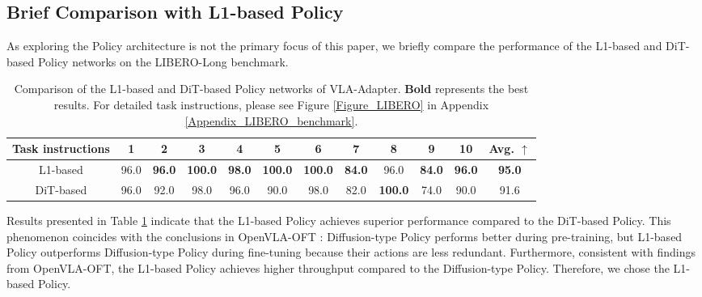 \subsection{Brief Comparison with L1-based Policy}\label{Appendix_DiT_3}
As exploring the Policy architecture is not the primary focus of this paper, we briefly compare the performance of the L1-based and DiT-based Policy networks on the LIBERO-Long benchmark.

\begin{table}[!htbp]
	\centering
	\small
	\caption{Comparison of the L1-based and DiT-based Policy networks of VLA-Adapter. \textbf{Bold} represents the best results. For detailed task instructions, please see Figure \ref{Figure_LIBERO} in Appendix \ref{Appendix_LIBERO_benchmark}.}\label{Table_DiT}%
	\begin{tabular}{c|cccccccccc|c}
		\toprule[1pt]
		\textbf{Task instructions} &1&2&3&4&5&6&7&8&9&10& \textbf{Avg. $\uparrow$}\\
		\midrule[0.5pt]
		\multicolumn{1}{c|}{L1-based} &\multicolumn{1}{c}{96.0}&\multicolumn{1}{c}{\textbf{96.0}}& \multicolumn{1}{c}{\textbf{100.0}} &\multicolumn{1}{c}{\textbf{98.0}}&\multicolumn{1}{c}{\textbf{100.0}}& \multicolumn{1}{c}{\textbf{100.0}}& \multicolumn{1}{c}{\textbf{84.0}}& \multicolumn{1}{c}{96.0}& \multicolumn{1}{c}{\textbf{84.0}}& \multicolumn{1}{c|}{\textbf{96.0}}&\multicolumn{1}{c}{\textbf{95.0}} \\
        
		\multicolumn{1}{c|}{DiT-based} & \multicolumn{1}{c}{96.0}&\multicolumn{1}{c}{92.0}&\multicolumn{1}{c}{98.0}&\multicolumn{1}{c}{96.0}&\multicolumn{1}{c}{90.0}& \multicolumn{1}{c}{98.0} &\multicolumn{1}{c}{82.0}& \multicolumn{1}{c}{\textbf{100.0}} &\multicolumn{1}{c}{74.0}& \multicolumn{1}{c|}{90.0}&\multicolumn{1}{c}{91.6} \\
		\bottomrule[1pt]
	\end{tabular}%
\end{table}%

Results presented in Table \ref{Table_DiT} indicate that the L1-based Policy achieves superior performance compared to the DiT-based Policy. This phenomenon coincides with the conclusions in OpenVLA-OFT \citep{OpenVLA-OFT-2025}: Diffusion-type Policy performs better during pre-training, but L1-based Policy outperforms Diffusion-type Policy during fine-tuning because their actions are less redundant. Furthermore, consistent with findings from OpenVLA-OFT, the L1-based Policy achieves higher throughput compared to the Diffusion-type Policy. Therefore, we chose the L1-based Policy.

